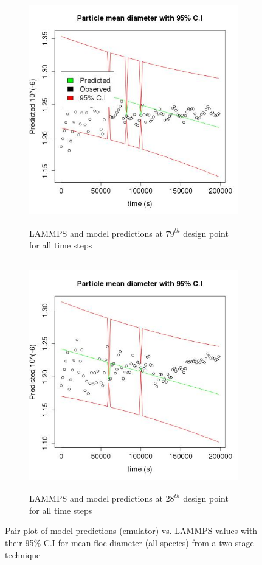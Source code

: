 \documentclass[12pt,titlepage]{report}
\theoremstyle{definition}
\theoremstyle{remark}
\begin{document}
\begin{figure}[!ht]
\begin{subfigure}[b]{.5\textwidth}
\includegraphics[height=10cm,width=1.1\textwidth]{res_plots/wole3}
\caption{LAMMPS and model predictions at $79^{th}$ design point for all time steps}
\label{myfigg9a1}
\end{subfigure}\hspace*{1em}
\begin{subfigure}[b]{.5\textwidth}
\includegraphics[height=10cm,width=1.1\textwidth]{res_plots/wole4}
\caption{LAMMPS and model predictions at $28^{th}$ design point for all time steps}
\label{myfigg9a2}
\end{subfigure}
\caption{Pair plot of model predictions (emulator) vs. LAMMPS values with their 95\% C.I for mean floc diameter (all species) from a two-stage technique}\label{myfig2}
\end{figure}
\end{document}

